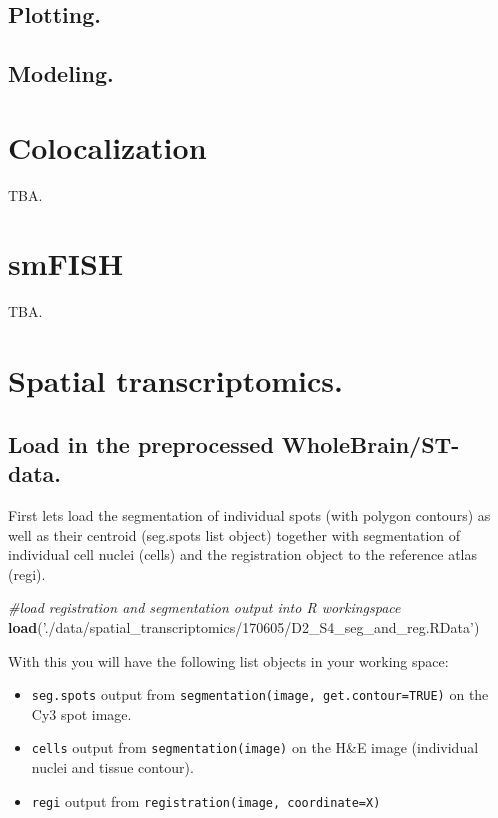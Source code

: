 \documentclass[]{book}
\newenvironment{Shaded}{\begin{snugshade}}{\end{snugshade}}
\newcommand{\KeywordTok}[1]{\textcolor[rgb]{0.13,0.29,0.53}{\textbf{{#1}}}}
\newcommand{\StringTok}[1]{\textcolor[rgb]{0.31,0.60,0.02}{{#1}}}
\newcommand{\CommentTok}[1]{\textcolor[rgb]{0.56,0.35,0.01}{\textit{{#1}}}}
\newcommand{\NormalTok}[1]{{#1}}
\providecommand{\tightlist}{%
  \setlength{\itemsep}{0pt}\setlength{\parskip}{0pt}}
\theoremstyle{definition}
\theoremstyle{definition}
\theoremstyle{remark}
\begin{document}
\section{Plotting.}\label{plotting.}

\section{Modeling.}\label{modeling.}

\chapter{Colocalization}\label{colocalization}

TBA.

\chapter{smFISH}\label{smfish}

TBA.

\chapter{Spatial transcriptomics.}\label{spatial-transcriptomics.}

\section{Load in the preprocessed
WholeBrain/ST-data.}\label{load-in-the-preprocessed-wholebrainst-data.}

First lets load the segmentation of individual spots (with polygon
contours) as well as their centroid (seg.spots list object) together
with segmentation of individual cell nuclei (cells) and the registration
object to the reference atlas (regi).

\begin{Shaded}
\begin{Highlighting}[]
\CommentTok{#load registration and segmentation output into R workingspace}
\KeywordTok{load}\NormalTok{(}\StringTok{'./data/spatial_transcriptomics/170605/D2_S4_seg_and_reg.RData'}\NormalTok{)}
\end{Highlighting}
\end{Shaded}

With this you will have the following list objects in your working
space:

\begin{itemize}
\tightlist
\item
  \texttt{seg.spots} output from
  \texttt{segmentation(image,\ get.contour=TRUE)} on the Cy3 spot image.
\item
  \texttt{cells} output from \texttt{segmentation(image)} on the H\&E
  image (individual nuclei and tissue contour).
\item
  \texttt{regi} output from \texttt{registration(image,\ coordinate=X)}
\end{itemize}
\end{document}
